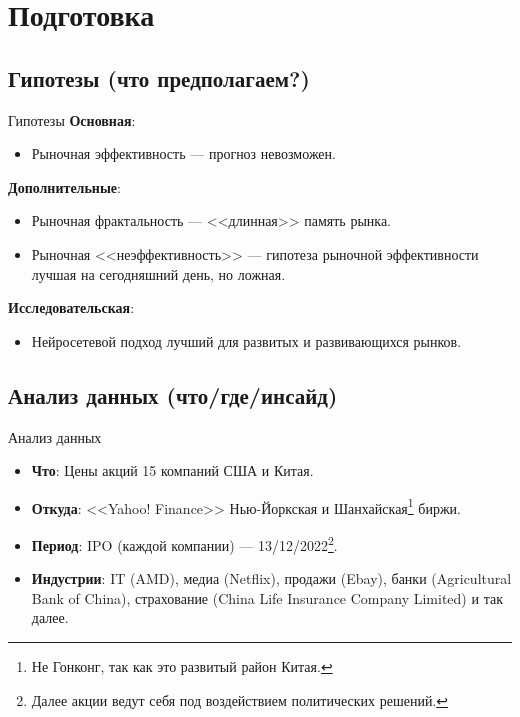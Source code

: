 \documentclass[11pt, aspectratio= 169]{beamer}
\begin{document}
	\section{Подготовка}
	\subsection{Гипотезы (что предполагаем?)}
	\begin{frame}{Гипотезы}
		\large
		\textbf{Основная}:
		\begin{itemize}
			\item Рыночная эффективность \cite{fama1970efficient} --- прогноз невозможен.
		\end{itemize}
		
		\textbf{Дополнительные}:
		\begin{itemize}
			\item Рыночная фрактальность \cite{mandelbrot2006misbehavior} --- <<длинная>> память рынка.
			\item Рыночная <<неэффективность>> \cite{matrin2011history} --- гипотеза рыночной эффективности лучшая на сегодняшний день, но ложная.
		\end{itemize}
	
		\textbf{Исследовательская}:
		\begin{itemize}
			\item Нейросетевой подход лучший для развитых и развивающихся рынков. 
		\end{itemize}
	\end{frame}
	
	\subsection{Анализ данных (что/где/инсайд)}
	\begin{frame}{Анализ данных}
		\Large
		\begin{itemize}
			\item[] \textbf{Что}: Цены акций 15 компаний США и Китая.
			\item[] \textbf{Откуда}: <<Yahoo! Finance>> Нью-Йоркская и Шанхайская\footnote{Не Гонконг, так как это развитый район Китая.} биржи.
			\item[] \textbf{Период}: IPO (каждой компании) --- 13/12/2022\footnote{Далее акции ведут себя под воздействием политических решений.}.
			\item[] \textbf{Индустрии}: IT (AMD), медиа (Netflix), продажи (Ebay), банки (Agricultural Bank of China), страхование (China Life Insurance Company Limited) и так далее.
		\end{itemize}
	\end{frame}
\end{document}
